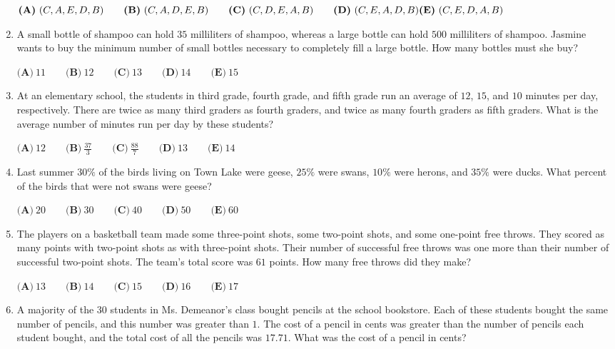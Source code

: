 \documentclass{article}
\begin{document}
\begin{enumerate}[label=\arabic*., itemsep=0.5em]
$
\textbf{(A)}\ (C, A, E, D, B) \qquad
\textbf{(B)}\ (C, A, D, E, B) \qquad
\textbf{(C)}\ (C, D, E, A, B) \qquad
\textbf{(D)}\ (C, E, A, D, B) \qquad \\
\textbf{(E)}\ (C, E, D, A, B) $\par \vspace{0.5em}\item A small bottle of shampoo can hold $35$ milliliters of shampoo, whereas a large bottle can hold $500$ milliliters of shampoo. Jasmine wants to buy the minimum number of small bottles necessary to completely fill a large bottle. How many bottles must she buy?

$
\textbf{(A)}\ 11 \qquad
\textbf{(B)}\ 12 \qquad
\textbf{(C)}\ 13 \qquad
\textbf{(D)}\ 14 \qquad
\textbf{(E)}\ 15 $\par \vspace{0.5em}\item At an elementary school, the students in third grade, fourth grade, and fifth grade run an average of $12$, $15$, and $10$ minutes per day, respectively. There are twice as many third graders as fourth graders, and twice as many fourth graders as fifth graders. What is the average number of minutes run per day by these students?

$
\textbf{(A)}\ 12 \qquad
\textbf{(B)}\ \frac{37}{3} \qquad
\textbf{(C)}\ \frac{88}{7} \qquad
\textbf{(D)}\ 13 \qquad
\textbf{(E)}\ 14 $\par \vspace{0.5em}\item Last summer $30\%$ of the birds living on Town Lake were geese, $25\%$ were swans, $10\%$ were herons, and $35\%$ were ducks. What percent of the birds that were not swans were geese?
 
$
\textbf{(A)}\ 20 \qquad
\textbf{(B)}\ 30 \qquad
\textbf{(C)}\ 40 \qquad
\textbf{(D)}\ 50 \qquad
\textbf{(E)}\ 60$\par \vspace{0.5em}\item The players on a basketball team made some three-point shots, some two-point shots, and some one-point free throws. They scored as many points with two-point shots as with three-point shots. Their number of successful free throws was one more than their number of successful two-point shots. The team's total score was $61$ points. How many free throws did they make?
 
$
\textbf{(A)}\ 13 \qquad
\textbf{(B)}\ 14 \qquad
\textbf{(C)}\ 15 \qquad
\textbf{(D)}\ 16 \qquad
\textbf{(E)}\ 17 $\par \vspace{0.5em}\item A majority of the $30$ students in Ms. Demeanor's class bought pencils at the school bookstore. Each of these students bought the same number of pencils, and this number was greater than $1$. The cost of a pencil in cents was greater than the number of pencils each student bought, and the total cost of all the pencils was $17.71$. What was the cost of a pencil in cents?


\end{enumerate}
\end{document}
